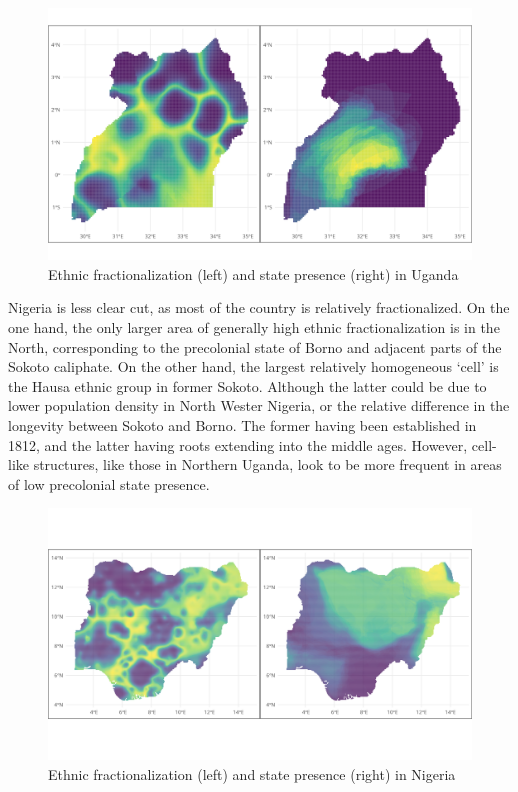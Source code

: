 \begin{figure}[htpb]
	\centering
	\includegraphics[width=1\linewidth]{img/ugaplots.png}
	\caption{Ethnic fractionalization (left) and state presence (right) in
	Uganda}
	\label{ugaplots}
\end{figure}

Nigeria is less clear cut, as most of the country is relatively fractionalized.
On the one hand, the only larger area of generally high ethnic fractionalization
is in the North,  corresponding to the precolonial state of Borno and adjacent
parts of the Sokoto caliphate. On the other hand, the largest relatively
homogeneous `cell' is the Hausa ethnic group in former Sokoto. Although the
latter could be due to lower population density in North Wester Nigeria, or the
relative difference in the longevity between Sokoto and Borno. The former having
been established in 1812, and the latter having roots extending into the middle
ages. However, cell-like structures, like those in Northern Uganda, look to be
more frequent in areas of low precolonial state presence.

\begin{figure}[htpb]
	\centering
	\includegraphics[width=1\linewidth]{img/nigplots.png}
	\caption{Ethnic fractionalization (left) and state presence (right) in
	Nigeria}%
	\label{nigplots}
\end{figure}

